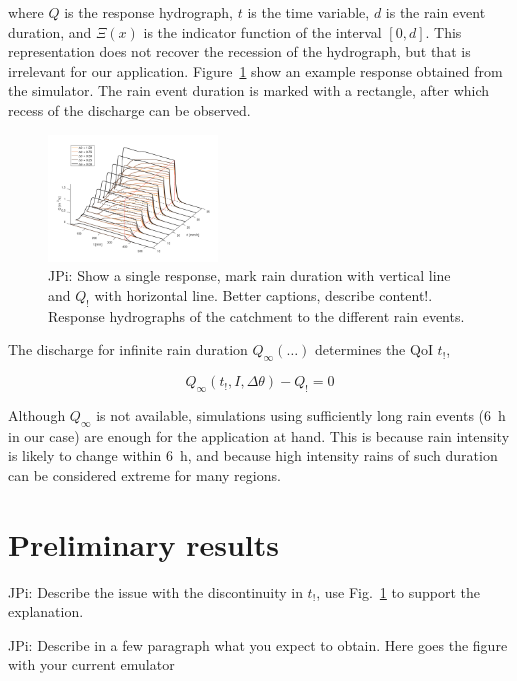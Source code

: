 \documentclass[12pt,a4paper,english,twocolumn,fleqn]{narms}
\newcommand{\jpi}[1]{{\color{Magenta} JPi: #1}}
\begin{document}
\noindent where $Q$ is the response hydrograph, $t$ is the time variable, $d$ is the rain event duration, and $\Xi(x)$ is the indicator function of the interval $[0,d]$.
This representation does not recover the recession of the hydrograph, but that is irrelevant for our application.
Figure~\ref{img:hydrographs} show an example response obtained from the simulator.
The rain event duration is marked with a rectangle, after which recess of the discharge can be observed.

\begin{figure}[htpb]
  \centering
  \includegraphics[width=0.4\textwidth]{img/hydrographs3d.png}
  \caption{\jpi{Show a single response, mark rain duration with vertical line and $Q_!$ with horizontal line. Better captions, describe content!}. Response hydrographs of the catchment to the different rain events.}
  \label{img:hydrographs}
\end{figure}

The discharge for infinite rain duration $Q_\infty(\ldots)$ determines the QoI $t_!$,

\begin{equation}
Q_\infty (t_!, I, \Delta\theta) - Q_! = 0
\end{equation}

\noindent Although $Q_\infty$ is not available, simulations using sufficiently long rain events (\SI{6}{\hour} in our case) are enough for the application at hand.
This is because rain intensity is likely to change within \SI{6}{\hour}, and because high intensity rains of such duration can be considered extreme for many regions.

\section{Preliminary results}
\jpi{Describe the issue with the discontinuity in $t_!$, use Fig.~\ref{img:hydrographs} to support the explanation.}

\jpi{Describe in a few paragraph what you expect to obtain. Here goes the figure with your current emulator}
\end{document}
